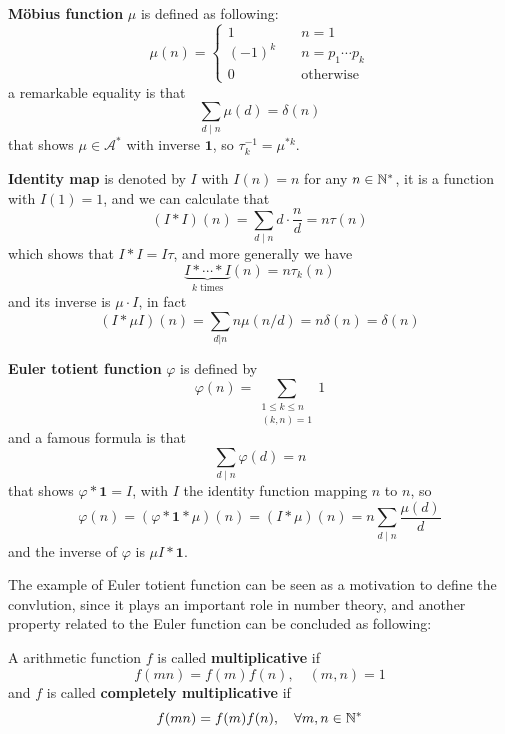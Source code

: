 \begin{colorexample}
    \textbf{Möbius function} \(\mu\) is defined as following:
    \[\mu(n) = \begin{cases}
        1 \quad & n =1 \\
        (-1)^k \quad & n=p_1\cdots p_k \\
        0 \quad & \text{otherwise}
    \end{cases}\]
    a remarkable equality is that 
    \[\sum_{d \mid n} \mu(d) = \delta(n)\]
    that shows \(\mu \in \mathcal{A}^*\) with inverse \(\mathbf{1}\), so \(\tau_k^{-1} = \mu^{*k}\).
    
\end{colorexample}

\begin{example}
    \textbf{Identity map} is denoted by \(I\) with \(I(n) = n\) for any \(n \in \mathbb{N}^*\), it is a function with \(I(1) = 1\), and we can calculate that
    \[(I*I)(n) = \sum_{d \mid n} d \cdot \frac{n}{d} = n \tau(n)\]
    which shows that \(I *I = I\tau \), and more generally we have 
    \[\underbrace{I * \cdots * I}_{k \text{ times}} (n) = n \tau_k(n) \]
    and its inverse is \(\mu \cdot I\), in fact
    \[(I * \mu I)(n) = \sum_{d|n}n \mu(n/d)  = n \delta (n) = \delta(n)\]
\end{example}

\begin{colorexample} \label{eulerfunction}
    \textbf{Euler totient function} \(\varphi\) is defined by
    \[\varphi(n) = \sum_{\substack{1 \leq k \leq n \\ (k,n) = 1}} 1\]
    and a famous formula is that
    \[\sum_{d \mid n} \varphi(d) = n\]
    that shows \(\varphi * \mathbf{1} = I\), with \(I\) the identity function mapping \(n\) to \(n\), so 
    \[\varphi(n) =  (\varphi* \mathbf{1} * \mu)(n) = (I * \mu)(n) = n\sum_{d \mid n}\frac{\mu(d)}{d}\]
    and the inverse of \(\varphi\) is \(\mu I * \mathbf{1}\).
\end{colorexample}

The example of Euler totient function can be seen as a motivation to define the convlution, since it plays an important role in number theory, and another property related to the Euler function can be concluded as following:

\begin{definition}
    A arithmetic function \(f\) is called \textbf{multiplicative} if 
    \[f(mn) = f(m)f(n), \quad (m,n) = 1\]
    and \(f\) is called \textbf{completely multiplicative} if 
    \[f(mn) = f(m)f(n), \quad \forall m,n \in \mathbb{N}^*\]
    
\end{definition}

